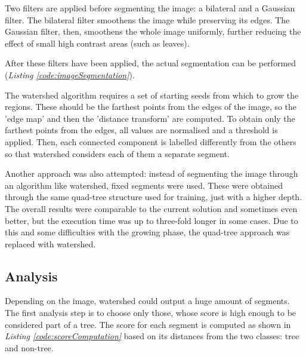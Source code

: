 \documentclass{article}
\begin{document}
Two filters are applied before segmenting the image: a bilateral and a Gaussian filter.
The bilateral filter smoothens the image while preserving its edges. The Gaussian filter, then, smoothens the whole image uniformly, further reducing the effect of small high contrast areas (such as leaves).

After these filters have been applied, the actual segmentation can be performed (\textit{Listing \ref{code:imageSegmentation}}).



The watershed algorithm requires a set of starting seeds from which to grow the regions. These should be the farthest points from the edges of the image, so the 'edge map' and then the 'distance transform' are computed.
To obtain only the farthest points from the edges, all values are normalised and a threshold is applied.
Then, each connected component is labelled differently from the others so that watershed considers each of them a separate segment.

Another approach was also attempted: instead of segmenting the image through an algorithm like watershed, fixed segments were used. These were obtained through the same quad-tree structure used for training, just with a higher depth. The overall results were comparable to the current solution and sometimes even better, but the execution time was up to three-fold longer in some cases. Due to this and some difficulties with the growing phase, the quad-tree approach was replaced with watershed.

\subsection{Analysis}
Depending on the image, watershed could output a huge amount of segments. The first analysis step is to choose only those, whose score is high enough to be considered part of a tree.
The score for each segment is computed as shown in \textit{Listing \ref{code:scoreComputation}} based on its distances from the two classes: tree and non-tree.


\end{document}
